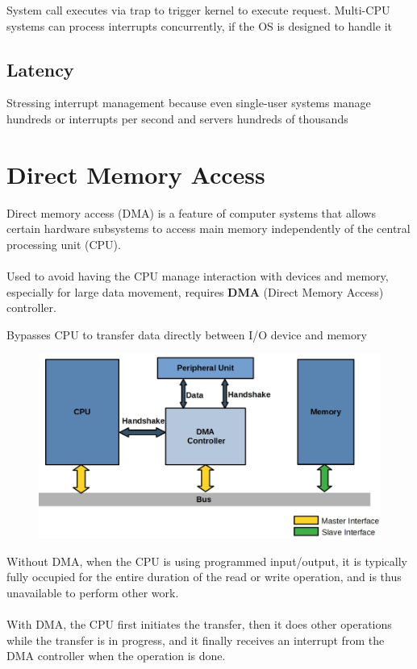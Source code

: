 System call executes via trap to trigger kernel to execute
request. Multi-CPU systems can process interrupts concurrently, if the OS is designed to handle it

\subsection{Latency}

Stressing interrupt management because even single-user systems
manage hundreds or interrupts per second and servers hundreds of
thousands


\section{Direct Memory Access}

Direct memory access (DMA) is a feature of computer systems that
allows certain hardware subsystems to access main memory
independently of the central processing unit (CPU).

\paragraph{}

Used to avoid having the CPU manage interaction with devices and
memory, especially for large data movement, requires \textbf{DMA} (Direct Memory Access) controller.

Bypasses CPU to transfer data directly between I/O device and
memory

\begin{figure}[h!]
    \centering
    \includegraphics[width=0.55\linewidth]{img/gngnf.png}
\end{figure}

Without DMA, when the CPU is using programmed input/output, it is
typically fully occupied for the entire duration of the read or write
operation, and is thus unavailable to perform other work. 

\paragraph{}
With DMA, the CPU first initiates the transfer, then it does other
operations while the transfer is in progress, and it finally receives an
interrupt from the DMA controller when the operation is done.

